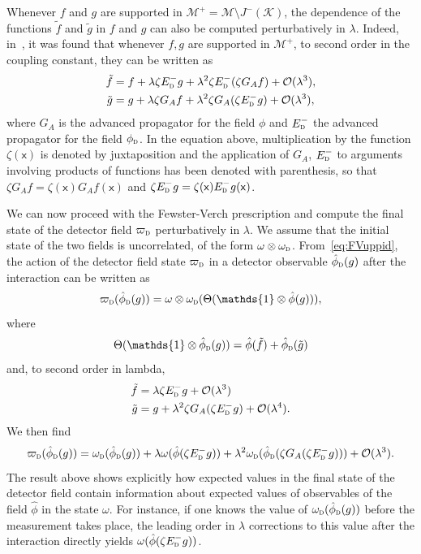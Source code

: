 \documentclass[letterpaper,12pt,titlepage,oneside,final]{book}
\newcommand{\openone}{\mathds{1}}
\newcommand{\M}{\mathcal{M}}
\newcommand{\mf}{\mathsf}%
\newcommand{\tc}[1]{\textsc{#1}}
\begin{document}
Whenever $f$ and $g$ are supported in $\M^+ = \M\setminus J^-(\mathcal{K})$, the dependence of the functions $\tilde{f}$ and $\tilde{g}$ in $f$ and $g$ can also be computed perturbatively in $\lambda$. Indeed, in~\cite{FVOG}, it was found that whenever $f,g$ are supported in $\M^+$, to second order in the coupling constant, they can be written as
\begin{align}
    \tilde{f} &= f + \lambda \zeta E^-_{\tc{d}} g + \lambda^2 \zeta E_\tc{d}^-(\zeta G_Af) + \mathcal{O}(\lambda^3),\\
    \tilde{g} &= g + \lambda \zeta G_Af + \lambda^2 \zeta G_A(\zeta E_\tc{d}^- g) + \mathcal{O}(\lambda^3),
\end{align}
where $G_A$ is the advanced propagator for the field $\phi$ and $E_\tc{d}^-$ the advanced propagator for the field $\phi_\tc{d}$. In the equation above, multiplication by the function $\zeta(\mf x)$ is denoted by juxtaposition and the application of $G_A$, $E_\tc{d}^-$ to arguments involving products of functions has been denoted with parenthesis, so that $\zeta G_Af = \zeta(\mf x) G_Af(\mf x)$  and $\zeta E_\tc{d}^-g = \zeta(\mf x) E_\tc{d}^-g(\mf x)$.

We can now proceed with the Fewster-Verch prescription and compute the final state of the detector field $\varpi_\tc{d}$ perturbatively in $\lambda$. We assume that the initial state of the two fields is uncorrelated, of the form $\omega\otimes \omega_\tc{d}$. From~\eqref{eq:FVuppid}, the action of the detector field state $\varpi_\tc{d}$ in a detector observable $\hat{\phi}_\tc{d}(g)$ after the interaction can be written as
\begin{equation}
    \varpi_\tc{d}(\hat{\phi}_\tc{d}(g)) = \omega\otimes\omega_\tc{d}(\Theta(\openone\otimes\hat{\phi}(g))),
\end{equation}
where
\begin{equation}
    \Theta(\openone\otimes\hat{\phi}_\tc{d}(g)) = \hat{\phi}(\tilde{f}) +  \hat{\phi}_\tc{d}(\tilde{g})
\end{equation}
and, to second order in lambda,
\begin{align}
    \tilde{f} &= \lambda \zeta E_\tc{d}^- g + \mathcal{O}(\lambda^3)\\
    \tilde{g} &= g + \lambda^2 \zeta G_A(\zeta E_\tc{d}^- g) + \mathcal{O}(\lambda^4).
\end{align}
We then find
\begin{equation}\label{eq:uppidphig}
    \varpi_\tc{d}(\hat{\phi}_\tc{d}(g)) = \omega_\tc{d}(\hat{\phi}_\tc{d}(g)) + \lambda \omega(\hat{\phi}(\zeta E_{\tc{d}}^- g)) + \lambda^2 \omega_\tc{d}(\hat{\phi}_\tc{d}(\zeta G_A(\zeta E_\tc{d}^-g))) + \mathcal{O}(\lambda^3).
\end{equation}
The result above shows explicitly how expected values in the final state of the detector field contain information about expected values of observables of the field $\hat{\phi}$ in the state $\omega$. For instance, if one knows the value of $\omega_\tc{d}(\hat{\phi}_\tc{d}({g}))$ before the measurement takes place, the leading order in $\lambda$ corrections to this value after the interaction directly yields $\omega(\hat{\phi}(\zeta E_\tc{d}^- g))$. 
\end{document}
